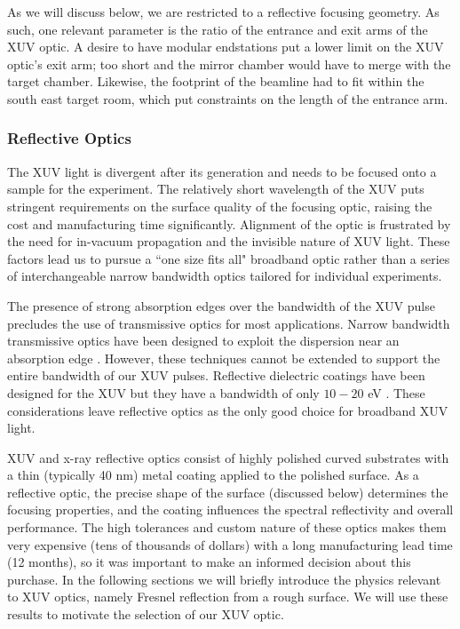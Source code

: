 As we will discuss below, we are restricted to a reflective focusing geometry. As such, one relevant parameter is the ratio of the entrance and exit arms of the XUV optic. A desire to have modular endstations put a lower limit on the XUV optic's exit arm; too short and the mirror chamber would have to merge with the target chamber. Likewise, the footprint of the beamline had to fit within the south east target room, which put constraints on the length of the entrance arm.

\subsubsection{Reflective Optics}

The XUV light is divergent after its generation and needs to be focused onto a sample for the experiment. The relatively short wavelength of the XUV puts stringent requirements on the surface quality of the focusing optic, raising the cost and manufacturing time significantly. Alignment of the optic is frustrated by the need for in-vacuum propagation and the invisible nature of XUV light. These factors lead us to pursue a ``one size fits all" broadband optic rather than a series of interchangeable narrow bandwidth optics tailored for individual experiments.

The presence of strong absorption edges over the bandwidth of the XUV pulse precludes the use of transmissive optics for most applications. Narrow bandwidth transmissive optics have been designed to exploit the dispersion near an absorption edge \cite{drescherExtremeultravioletRefractiveOptics2018}. However, these techniques cannot be extended to support the entire bandwidth of our XUV pulses. Reflective dielectric coatings have been designed for the XUV but they have a bandwidth of only $10-20$ eV \cite{kiesewetterDynamicsNearThresholdAttosecond2019}. These considerations leave reflective optics as the only good choice for broadband XUV light.

XUV and x-ray reflective optics consist of highly polished curved substrates with a thin (typically 40 nm) metal coating applied to the polished surface. As a reflective optic, the precise shape of the surface (discussed below) determines the focusing properties, and the coating influences the spectral reflectivity and overall performance. The high tolerances and custom nature of these optics makes them very expensive (tens of thousands of dollars) with a long manufacturing lead time (12 months), so it was important to make an informed decision about this purchase. In the following sections we will briefly introduce the physics relevant to XUV optics, namely Fresnel reflection from a rough surface. We will use these results to motivate the selection of our XUV optic.

